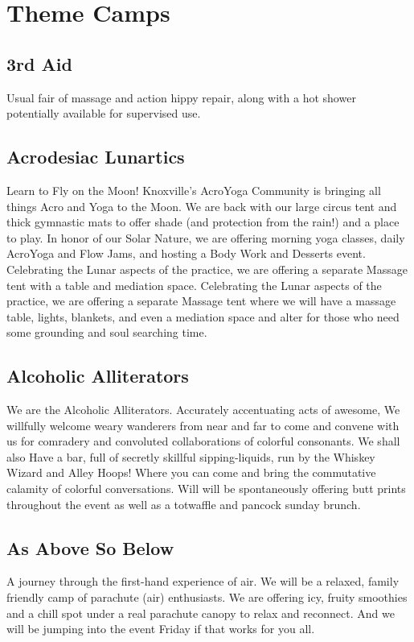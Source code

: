 %
%

\chapter{Theme Camps}

\begin{multicols}{2}
\section*{3rd Aid}
Usual fair of massage and action hippy repair, along with a hot shower potentially available for supervised use. 


\section*{Acrodesiac Lunartics}
Learn to Fly on the Moon! Knoxville's AcroYoga Community is bringing all things Acro and Yoga to the Moon. We are back with our large circus tent and thick gymnastic mats to offer shade (and protection from the rain!) and a place to play. In honor of our Solar Nature, we are offering morning yoga classes, daily AcroYoga and Flow Jams, and hosting a Body Work and Desserts event. Celebrating the Lunar aspects of the practice, we are offering a separate Massage tent with a table and mediation space. Celebrating the Lunar aspects of the practice, we are offering a separate Massage tent where we will have a massage table, lights, blankets, and even a mediation space and alter for those who need some grounding and soul searching time. 




\section*{Alcoholic Alliterators}
We are the Alcoholic Alliterators. Accurately accentuating acts of awesome, We willfully welcome weary wanderers from near and far to come and convene with us for comradery and convoluted collaborations of colorful consonants. We shall also Have a bar, full of secretly skillful sipping-liquids, run by the Whiskey Wizard and Alley Hoops! Where you can come and bring the commutative calamity of colorful conversations. Will will be spontaneously offering butt prints throughout the event as well as a totwaffle and pancock sunday brunch.




\section*{As Above So Below}
A journey through the first-hand experience of air. We will be a relaxed, family friendly camp of parachute (air) enthusiasts. We are offering icy, fruity smoothies and a chill spot under a real parachute canopy to relax and reconnect. And we will be jumping into the event Friday if that works for you all. 



\end{multicols}
